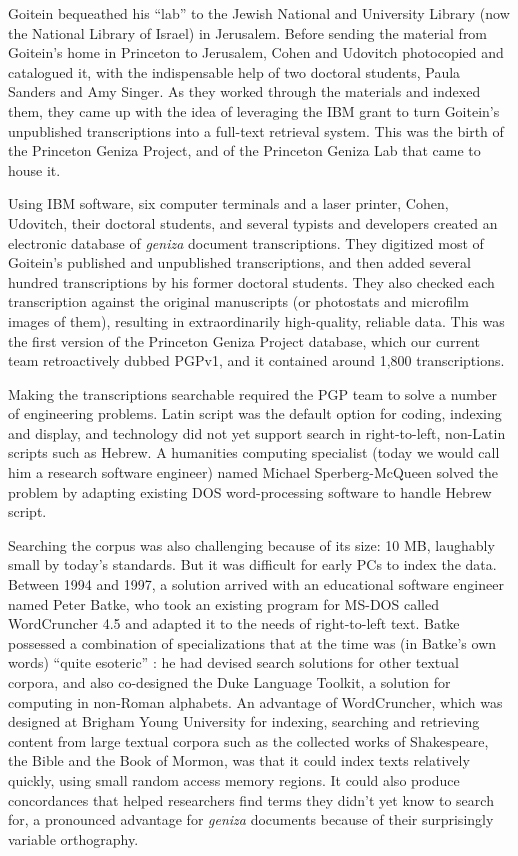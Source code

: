 \documentclass{article}
\begin{document}
Goitein bequeathed his “lab” to the Jewish National and University Library (now the National Library of Israel) in Jerusalem. Before sending the material from Goitein's home in Princeton to Jerusalem, Cohen and Udovitch photocopied and catalogued it, with the indispensable help of two doctoral students, Paula Sanders and Amy Singer. As they worked through the materials and indexed them, they came up with the idea of leveraging the IBM grant to turn Goitein’s unpublished transcriptions into a full-text retrieval system. This was the birth of the Princeton Geniza Project, and of the Princeton Geniza Lab that came to house it.

Using IBM software, six computer terminals and a laser printer, Cohen, Udovitch, their doctoral students, and several typists and developers created an electronic database of \textit{geniza} document transcriptions. They digitized most of Goitein’s published and unpublished transcriptions, and then added several hundred transcriptions by his former doctoral students. They also checked each transcription against the original manuscripts (or photostats and microfilm images of them), resulting in extraordinarily high-quality, reliable data. This was the first version of the Princeton Geniza Project database, which our current team retroactively dubbed PGPv1, and it contained around 1,800 transcriptions.

Making the transcriptions searchable required the PGP team to solve a number of engineering problems. Latin script was the default option for coding, indexing and display, and technology did not yet support search in right-to-left, non-Latin scripts such as Hebrew. A humanities computing specialist (today we would call him a research software engineer) named Michael Sperberg-McQueen solved the problem by adapting existing DOS word-processing software to handle Hebrew script. 

Searching the corpus was also challenging because of its size: 10 MB, laughably small by today’s standards. But it was difficult for early PCs to index the data. Between 1994 and 1997, a solution arrived with an educational software engineer named Peter Batke, who took an existing program for MS-DOS called WordCruncher 4.5 and adapted it to the needs of right-to-left text. Batke possessed a combination of specializations that at the time was (in Batke's own words) “quite esoteric” \autocite{noauthor_background_nodate}: he had devised search solutions for other textual corpora, and also co-designed the Duke Language Toolkit, a solution for computing in non-Roman alphabets. An advantage of WordCruncher, which was designed at Brigham Young University for indexing, searching and retrieving content from large textual corpora such as the collected works of Shakespeare, the Bible and the Book of Mormon, was that it could index texts relatively quickly, using small random access memory regions. It could also produce concordances that helped researchers find terms they didn’t yet know to search for, a pronounced advantage for \textit{geniza} documents because of their surprisingly variable orthography. 
\end{document}
